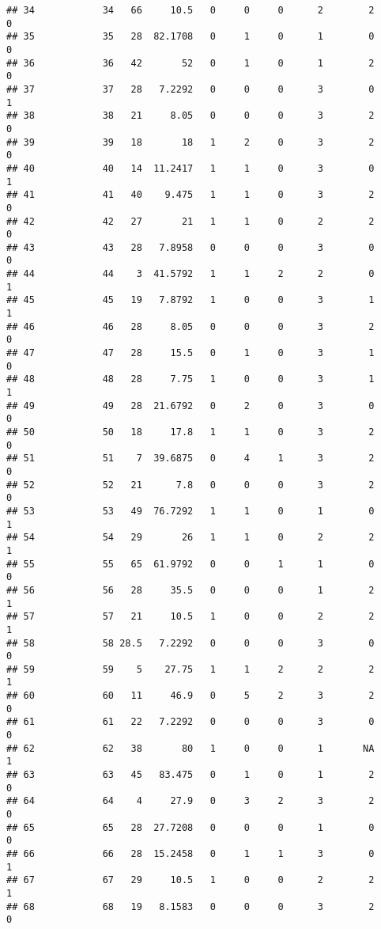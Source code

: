 \documentclass[
]{article}
\begin{document}
\begin{verbatim}
## 34            34   66     10.5   0     0     0      2        2         0
## 35            35   28  82.1708   0     1     0      1        0         0
## 36            36   42       52   0     1     0      1        2         0
## 37            37   28   7.2292   0     0     0      3        0         1
## 38            38   21     8.05   0     0     0      3        2         0
## 39            39   18       18   1     2     0      3        2         0
## 40            40   14  11.2417   1     1     0      3        0         1
## 41            41   40    9.475   1     1     0      3        2         0
## 42            42   27       21   1     1     0      2        2         0
## 43            43   28   7.8958   0     0     0      3        0         0
## 44            44    3  41.5792   1     1     2      2        0         1
## 45            45   19   7.8792   1     0     0      3        1         1
## 46            46   28     8.05   0     0     0      3        2         0
## 47            47   28     15.5   0     1     0      3        1         0
## 48            48   28     7.75   1     0     0      3        1         1
## 49            49   28  21.6792   0     2     0      3        0         0
## 50            50   18     17.8   1     1     0      3        2         0
## 51            51    7  39.6875   0     4     1      3        2         0
## 52            52   21      7.8   0     0     0      3        2         0
## 53            53   49  76.7292   1     1     0      1        0         1
## 54            54   29       26   1     1     0      2        2         1
## 55            55   65  61.9792   0     0     1      1        0         0
## 56            56   28     35.5   0     0     0      1        2         1
## 57            57   21     10.5   1     0     0      2        2         1
## 58            58 28.5   7.2292   0     0     0      3        0         0
## 59            59    5    27.75   1     1     2      2        2         1
## 60            60   11     46.9   0     5     2      3        2         0
## 61            61   22   7.2292   0     0     0      3        0         0
## 62            62   38       80   1     0     0      1       NA         1
## 63            63   45   83.475   0     1     0      1        2         0
## 64            64    4     27.9   0     3     2      3        2         0
## 65            65   28  27.7208   0     0     0      1        0         0
## 66            66   28  15.2458   0     1     1      3        0         1
## 67            67   29     10.5   1     0     0      2        2         1
## 68            68   19   8.1583   0     0     0      3        2         0

\end{verbatim}
\end{document}
